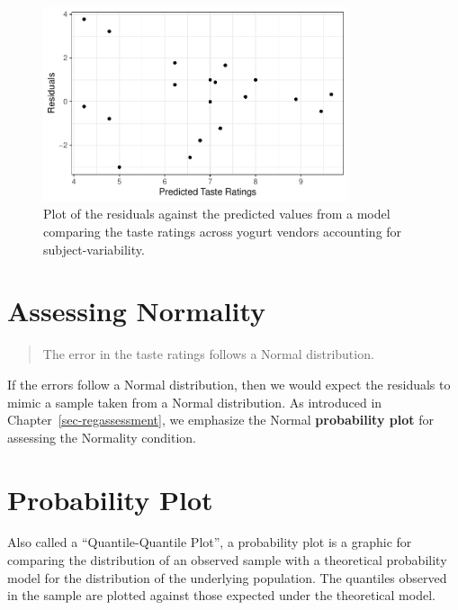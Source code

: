 \documentclass[
  letterpaper,
  DIV=11,
  numbers=noendperiod]{scrreprt}
\theoremstyle{plain}
\theoremstyle{definition}
\theoremstyle{definition}
\theoremstyle{remark}
\begin{document}
\begin{figure}

{\centering \includegraphics[width=0.8\textwidth,height=\textheight]{./images/fig-blockassessment-variance-yogurt-1.pdf}

}

\caption{\label{fig-blockassessment-variance-yogurt}Plot of the
residuals against the predicted values from a model comparing the taste
ratings across yogurt vendors accounting for subject-variability.}

\end{figure}

\hypertarget{assessing-normality-2}{%
\section{Assessing Normality}\label{assessing-normality-2}}

\begin{quote}
The error in the taste ratings follows a Normal distribution.
\end{quote}

If the errors follow a Normal distribution, then we would expect the
residuals to mimic a sample taken from a Normal distribution. As
introduced in Chapter~\ref{sec-regassessment}, we emphasize the Normal
\textbf{probability plot} for assessing the Normality condition.

\hypertarget{probability-plot-2}{%
\section{Probability Plot}\label{probability-plot-2}}

Also called a ``Quantile-Quantile Plot'', a probability plot is a
graphic for comparing the distribution of an observed sample with a
theoretical probability model for the distribution of the underlying
population. The quantiles observed in the sample are plotted against
those expected under the theoretical model.
\end{document}
